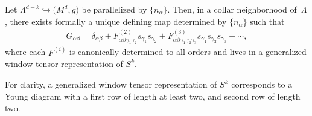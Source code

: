 \begin{Theorem} \label{general-ho-ext}
Let $\Lambda^{d-k} \hookrightarrow \bigl(M^d,g\bigr)$ be parallelized by $\{n_{\alpha}\}$. Then, in a collar neighborhood of~$\Lambda$, there exists formally a unique defining map determined by $\{n_{\alpha}\}$ such that
\begin{align} \label{window-expansion}
G_{\alpha \beta} = \delta_{\alpha \beta} + F^{(2)}_{\alpha \beta \gamma_1 \gamma_2} s_{\gamma_1} s_{\gamma_2} + F^{(3)}_{\alpha \beta \gamma_1 \gamma_2 \gamma_3} s_{\gamma_1} s_{\gamma_2} s_{\gamma_3} + \cdots,
\end{align}
where each $F^{(i)}$ is canonically determined to all orders and lives in a generalized window tensor representation of $S^k$.
\end{Theorem}
For clarity, a generalized window tensor representation of $S^k$ corresponds to a Young diagram with a first row of length at least two, and second row of length two.
